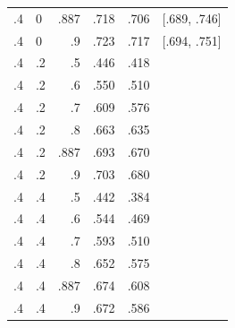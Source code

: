 \begin{longtable}{llrrrr}
.4 & 0 & .887 & .718 & .706 & [.689, .746] \\
.4 & 0 & .9 & .723 & .717 & [.694, .751] \\
.4 & .2 & .5 & .446 & .418 &  \\
.4 & .2 & .6 & .550 & .510 &  \\
.4 & .2 & .7 & .609 & .576 &  \\
.4 & .2 & .8 & .663 & .635 &  \\
.4 & .2 & .887 & .693 & .670 &  \\
.4 & .2 & .9 & .703 & .680 &  \\
.4 & .4 & .5 & .442 & .384 &  \\
.4 & .4 & .6 & .544 & .469 &  \\
.4 & .4 & .7 & .593 & .510 &  \\
.4 & .4 & .8 & .652 & .575 &  \\
.4 & .4 & .887 & .674 & .608 &  \\
.4 & .4 & .9 & .672 & .586 &  \\
\end{longtable}
\endgroup
